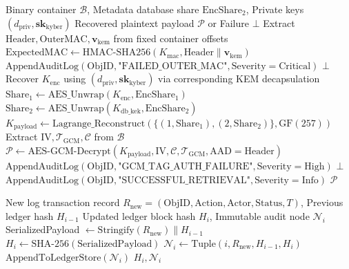 \documentclass[pdflatex,sn-mathphys,Numbered]{sn-jnl}%
\theoremstyle{thmstyleone}%
\theoremstyle{thmstyletwo}%
\theoremstyle{thmstylethree}%
\begin{document}
\begin{algorithm}[!htbp]
\caption{Secure Retrieval, Outer HMAC Verification, and Key Reconstruction}
\label{alg:retrieval}
\begin{algorithmic}[1]
\Require Binary container $\mathcal{B}$, Metadata database share $\text{EncShare}_2$, Private keys $(d_{\text{priv}}, \mathbf{sk}_{\text{kyber}})$
\Ensure Recovered plaintext payload $\mathcal{P}$ or Failure $\bot$
\State Extract $\text{Header}, \text{OuterMAC}, \mathbf{v}_{\text{kem}}$ from fixed container offsets
\State $\text{ExpectedMAC} \gets \text{HMAC-SHA256}(K_{\text{mac}}, \text{Header} \parallel \mathbf{v}_{\text{kem}})$
    \State $\text{AppendAuditLog}(\text{ObjID}, \text{"FAILED\_OUTER\_MAC"}, \text{Severity}=\text{Critical})$
    \State \Return $\bot$ 
\EndIf
\State Recover $K_{\text{enc}}$ using $(d_{\text{priv}}, \mathbf{sk}_{\text{kyber}})$ via corresponding KEM decapsulation
\State $\text{Share}_1 \gets \text{AES\_Unwrap}(K_{\text{enc}}, \text{EncShare}_1)$
\State $\text{Share}_2 \gets \text{AES\_Unwrap}(K_{\text{db\_kek}}, \text{EncShare}_2)$
\State $K_{\text{payload}} \gets \text{Lagrange\_Reconstruct}(\{(1, \text{Share}_1), (2, \text{Share}_2)\}, \text{GF}(257))$
\State Extract $\text{IV}, \mathcal{T}_{\text{GCM}}, \mathcal{C}$ from $\mathcal{B}$
\State $\mathcal{P} \gets \text{AES-GCM-Decrypt}(K_{\text{payload}}, \text{IV}, \mathcal{C}, \mathcal{T}_{\text{GCM}}, \text{AAD}=\text{Header})$
    \State $\text{AppendAuditLog}(\text{ObjID}, \text{"GCM\_TAG\_AUTH\_FAILURE"}, \text{Severity}=\text{High})$
    \State \Return $\bot$
\EndIf
\State $\text{AppendAuditLog}(\text{ObjID}, \text{"SUCCESSFUL\_RETRIEVAL"}, \text{Severity}=\text{Info})$
\State \Return $\mathcal{P}$
\end{algorithmic}
\end{algorithm}

\begin{algorithm}[!htbp]
\caption{Cryptographic Hash-Chain Append and Forensic Auditing}
\label{alg:hashchain}
\begin{algorithmic}[1]
\Require New log transaction record $R_{\text{new}} = (\text{ObjID}, \text{Action}, \text{Actor}, \text{Status}, T)$, Previous ledger hash $H_{i-1}$
\Ensure Updated ledger block hash $H_i$, Immutable audit node $\mathcal{N}_i$
\State SerializedPayload $\gets \text{Stringify}(R_{\text{new}}) \parallel H_{i-1}$
\State $H_i \gets \text{SHA-256}(\text{SerializedPayload})$
\State $\mathcal{N}_i \gets \text{Tuple}(i, R_{\text{new}}, H_{i-1}, H_i)$
\State $\text{AppendToLedgerStore}(\mathcal{N}_i)$
\State \Return $H_i, \mathcal{N}_i$
\end{algorithmic}
\end{algorithm}
\end{document}
